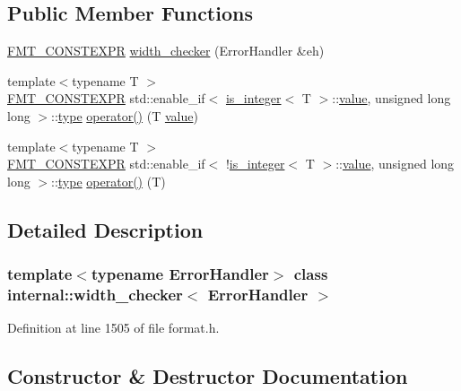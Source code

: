 \subsection*{Public Member Functions}
\begin{DoxyCompactItemize}
\item 
\hyperlink{core_8h_a69201cb276383873487bf68b4ef8b4cd}{F\+M\+T\+\_\+\+C\+O\+N\+S\+T\+E\+X\+PR} \hyperlink{classinternal_1_1width__checker_a499700f9c61e326c4494fa47d53fb659}{width\+\_\+checker} (Error\+Handler \&eh)
\item 
{\footnotesize template$<$typename T $>$ }\\\hyperlink{core_8h_a69201cb276383873487bf68b4ef8b4cd}{F\+M\+T\+\_\+\+C\+O\+N\+S\+T\+E\+X\+PR} std\+::enable\+\_\+if$<$ \hyperlink{structinternal_1_1is__integer}{is\+\_\+integer}$<$ T $>$\+::\hyperlink{classinternal_1_1value}{value}, unsigned long long $>$\+::\hyperlink{namespaceinternal_a8661864098ac0acff9a6dd7e66f59038}{type} \hyperlink{classinternal_1_1width__checker_a7906905e5fdcd699c26173ab5414966b}{operator()} (T \hyperlink{classinternal_1_1value}{value})
\item 
{\footnotesize template$<$typename T $>$ }\\\hyperlink{core_8h_a69201cb276383873487bf68b4ef8b4cd}{F\+M\+T\+\_\+\+C\+O\+N\+S\+T\+E\+X\+PR} std\+::enable\+\_\+if$<$ !\hyperlink{structinternal_1_1is__integer}{is\+\_\+integer}$<$ T $>$\+::\hyperlink{classinternal_1_1value}{value}, unsigned long long $>$\+::\hyperlink{namespaceinternal_a8661864098ac0acff9a6dd7e66f59038}{type} \hyperlink{classinternal_1_1width__checker_a63c09aea3b0cf4bc794968048e94d743}{operator()} (T)
\end{DoxyCompactItemize}


\subsection{Detailed Description}
\subsubsection*{template$<$typename Error\+Handler$>$\newline
class internal\+::width\+\_\+checker$<$ Error\+Handler $>$}



Definition at line 1505 of file format.\+h.



\subsection{Constructor \& Destructor Documentation}
\mbox{\label{classinternal_1_1width__checker_a499700f9c61e326c4494fa47d53fb659}} 
